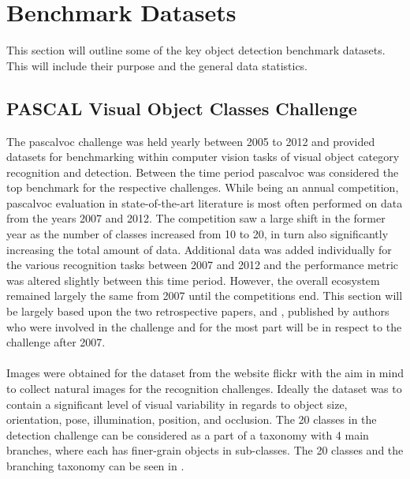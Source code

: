 \section{Benchmark Datasets}
This section will outline some of the key object detection benchmark datasets. This will include their purpose and the general data statistics.


\subsection{PASCAL Visual Object Classes Challenge}
The \gls{pascalvoc} challenge \cite{pascalvoc2012} was held yearly between 2005 to 2012 and provided datasets for benchmarking within computer vision tasks of visual object category recognition and detection. Between the time period \gls{pascalvoc} was considered the top benchmark for the respective challenges. While being an annual competition, \gls{pascalvoc} evaluation in state-of-the-art literature is most often performed on data from the years 2007 and 2012. The competition saw a large shift in the former year as the number of classes increased from 10 to 20, in turn also significantly increasing the total amount of data. Additional data was added individually for the various recognition tasks between 2007 and 2012 and the performance metric was altered slightly between this time period. However, the overall ecosystem remained largely the same from 2007 until the competitions end. This section will be largely based upon the two retrospective papers, \cite{pascalvoc2010} and \cite{pascalvoc2015}, published by authors who were involved in the challenge and for the most part will be in respect to the challenge after 2007.
\\\\
Images were obtained for the dataset from the website flickr \cite{flickr} with the aim in mind to collect natural images for the recognition challenges. Ideally the dataset was to contain a significant level of visual variability in regards to object size, orientation, pose, illumination, position, and occlusion. The 20 classes in the detection challenge can be considered as a part of a taxonomy with 4 main branches, where each has finer-grain objects in sub-classes. The 20 classes and the branching taxonomy can be seen in .


